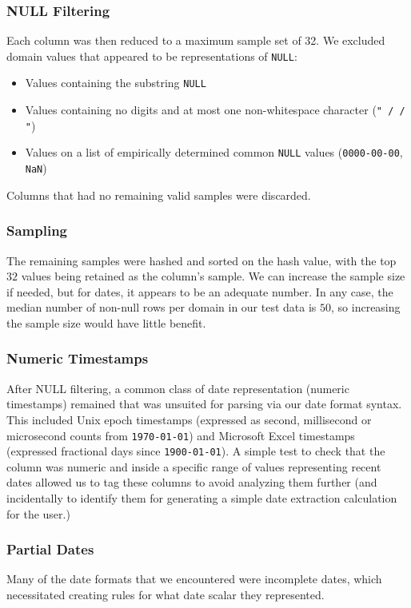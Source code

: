 \subsubsection{NULL Filtering}
Each column was then reduced to a maximum sample set of 32. We excluded domain values that appeared to be representations of \texttt{NULL}:
\begin{itemize}
\item Values containing the substring \texttt{NULL}
\item Values containing no digits and at most one non-whitespace character (\eg \texttt{" / / "})
\item Values on a list of empirically determined common \texttt{NULL} values (\eg \texttt{0000-00-00}, \texttt{NaN})
\end{itemize}
Columns that had no remaining valid samples were discarded. 

\subsubsection{Sampling}
The remaining samples were hashed and sorted on the hash value, with the top $32$ values being retained as the column's sample. We can increase the sample size if needed, but for dates, it appears to be an adequate number. In any case, the median number of non-null rows per domain in our test data is $50$, so increasing the sample size would have little benefit.

\subsubsection{Numeric Timestamps}
After NULL filtering, a common class of date representation (numeric timestamps) remained that was unsuited for parsing via our date format syntax. This included Unix epoch timestamps (expressed as second, millisecond or microsecond counts from \texttt{1970-01-01}) and Microsoft Excel timestamps (expressed fractional days since \texttt{1900-01-01}). A simple test to check that the column was numeric and inside a specific range of values representing recent dates allowed us to tag these columns to avoid analyzing them further (and incidentally to identify them for generating a simple date extraction calculation for the user.)


\subsubsection{Partial Dates}
Many of the date formats that we encountered were incomplete dates, which necessitated creating rules for what date scalar they represented.

